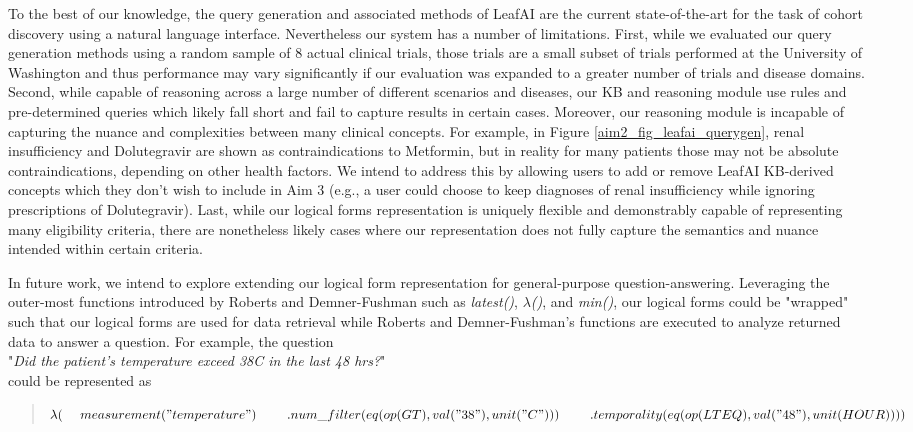 \documentclass[../main.tex]{subfiles}
\begin{document}
To the best of our knowledge, the query generation and associated methods of LeafAI are the current state-of-the-art for the task of cohort discovery using a natural language interface. Nevertheless our system has a number of limitations. First, while we evaluated our query generation methods using a random sample of 8 actual clinical trials, those trials are a small subset of trials performed at the University of Washington and thus performance may vary significantly if our evaluation was expanded to a greater number of trials and disease domains. Second, while capable of reasoning across a large number of different scenarios and diseases, our KB and reasoning module use rules and pre-determined queries which likely fall short and fail to capture results in certain cases. Moreover, our reasoning module is incapable of capturing the nuance and complexities between many clinical concepts. For example, in Figure \ref{aim2_fig_leafai_querygen}, renal insufficiency and Dolutegravir are shown as contraindications to Metformin, but in reality for many patients those may not be absolute contraindications, depending on other health factors. We intend to address this by allowing users to add or remove LeafAI KB-derived concepts which they don't wish to include in Aim 3 (e.g., a user could choose to keep diagnoses of renal insufficiency while ignoring prescriptions of Dolutegravir). Last, while our logical forms representation is uniquely flexible and demonstrably capable of representing many eligibility criteria, there are nonetheless likely cases where our representation does not fully capture the semantics and nuance intended within certain criteria.

In future work, we intend to explore extending our logical form representation for general-purpose question-answering. Leveraging the outer-most functions introduced by Roberts and Demner-Fushman such as \textit{latest()}, $\lambda$\textit{()}, and \textit{min()}, our logical forms could be "wrapped" such that our logical forms are used for data retrieval while Roberts and Demner-Fushman's functions are executed to analyze returned data to answer a question. For example, the question \\

"\textit{Did the patient’s temperature exceed 38C in the last 48 hrs?}" \\

\noindent could be represented as

\begin{quote}
$\lambda( \\
    \mathrm{\ \ \ \ }measurement("temperature") \\
    \mathrm{\ \ \ \ \ \ \ }.num\_filter(eq(op(GT), val("38"), unit("C")))\\
    \mathrm{\ \ \ \ \ \ \ }.temporality(eq(op(LTEQ), val("48"), unit(HOUR))) \\
)$
\end{quote}
\end{document}
